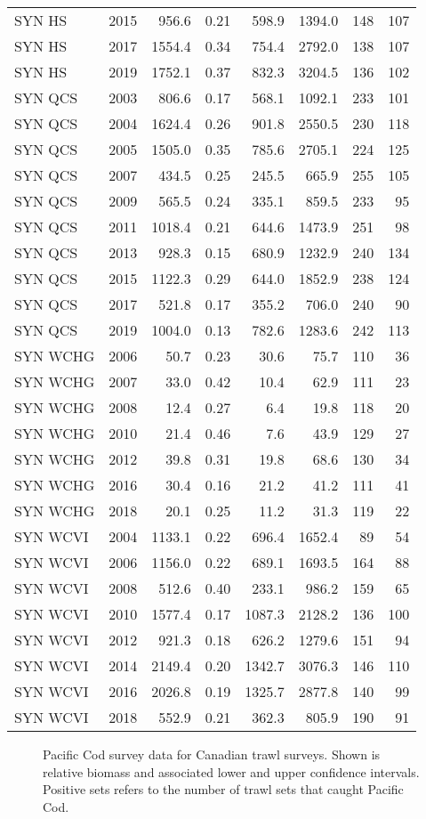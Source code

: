 \documentclass[11pt]{book}
\begin{document}
\begin{longtable}[]{@{}lrrrrrrr@{}}
SYN HS & 2015 & 956.6 & 0.21 & 598.9 & 1394.0 & 148 & 107\tabularnewline
SYN HS & 2017 & 1554.4 & 0.34 & 754.4 & 2792.0 & 138 & 107\tabularnewline
SYN HS & 2019 & 1752.1 & 0.37 & 832.3 & 3204.5 & 136 & 102\tabularnewline
SYN QCS & 2003 & 806.6 & 0.17 & 568.1 & 1092.1 & 233 & 101\tabularnewline
SYN QCS & 2004 & 1624.4 & 0.26 & 901.8 & 2550.5 & 230 & 118\tabularnewline
SYN QCS & 2005 & 1505.0 & 0.35 & 785.6 & 2705.1 & 224 & 125\tabularnewline
SYN QCS & 2007 & 434.5 & 0.25 & 245.5 & 665.9 & 255 & 105\tabularnewline
SYN QCS & 2009 & 565.5 & 0.24 & 335.1 & 859.5 & 233 & 95\tabularnewline
SYN QCS & 2011 & 1018.4 & 0.21 & 644.6 & 1473.9 & 251 & 98\tabularnewline
SYN QCS & 2013 & 928.3 & 0.15 & 680.9 & 1232.9 & 240 & 134\tabularnewline
SYN QCS & 2015 & 1122.3 & 0.29 & 644.0 & 1852.9 & 238 & 124\tabularnewline
SYN QCS & 2017 & 521.8 & 0.17 & 355.2 & 706.0 & 240 & 90\tabularnewline
SYN QCS & 2019 & 1004.0 & 0.13 & 782.6 & 1283.6 & 242 & 113\tabularnewline
SYN WCHG & 2006 & 50.7 & 0.23 & 30.6 & 75.7 & 110 & 36\tabularnewline
SYN WCHG & 2007 & 33.0 & 0.42 & 10.4 & 62.9 & 111 & 23\tabularnewline
SYN WCHG & 2008 & 12.4 & 0.27 & 6.4 & 19.8 & 118 & 20\tabularnewline
SYN WCHG & 2010 & 21.4 & 0.46 & 7.6 & 43.9 & 129 & 27\tabularnewline
SYN WCHG & 2012 & 39.8 & 0.31 & 19.8 & 68.6 & 130 & 34\tabularnewline
SYN WCHG & 2016 & 30.4 & 0.16 & 21.2 & 41.2 & 111 & 41\tabularnewline
SYN WCHG & 2018 & 20.1 & 0.25 & 11.2 & 31.3 & 119 & 22\tabularnewline
SYN WCVI & 2004 & 1133.1 & 0.22 & 696.4 & 1652.4 & 89 & 54\tabularnewline
SYN WCVI & 2006 & 1156.0 & 0.22 & 689.1 & 1693.5 & 164 & 88\tabularnewline
SYN WCVI & 2008 & 512.6 & 0.40 & 233.1 & 986.2 & 159 & 65\tabularnewline
SYN WCVI & 2010 & 1577.4 & 0.17 & 1087.3 & 2128.2 & 136 & 100\tabularnewline
SYN WCVI & 2012 & 921.3 & 0.18 & 626.2 & 1279.6 & 151 & 94\tabularnewline
SYN WCVI & 2014 & 2149.4 & 0.20 & 1342.7 & 3076.3 & 146 & 110\tabularnewline
SYN WCVI & 2016 & 2026.8 & 0.19 & 1325.7 & 2877.8 & 140 & 99\tabularnewline
SYN WCVI & 2018 & 552.9 & 0.21 & 362.3 & 805.9 & 190 & 91\tabularnewline
\bottomrule
\end{longtable}
\begin{figure}[htb]

{\centering {} 

}

\caption{Pacific Cod survey data for Canadian trawl surveys. Shown is relative biomass and associated lower and upper confidence intervals. Positive sets refers to the number of trawl sets that caught Pacific Cod.}\label{fig:surv-canadian}
\end{figure}
\clearpage
\end{document}
